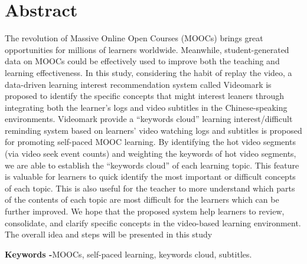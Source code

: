 \chapter*{Abstract}
The revolution of Massive Online Open Courses (MOOCs) brings great opportunities for millions of learners worldwide. Meanwhile, student-generated data on MOOCs could be effectively used to improve both the teaching and learning effectiveness.
In this study, considering the habit of replay the video, a data-driven learning interest recommendation system called Videomark is proposed to identify the specific concepts that might interest leaners through integrating both the learner’s logs and video subtitles in the Chinese-speaking environments.
Videomark provide a “keywords cloud” learning interest/difficult reminding system based on learners’ video watching logs and subtitles is proposed for promoting self-paced MOOC learning.
By identifying the hot video segments (via video seek event counts) and weighting the keywords of hot video segments, we are able to establish the “keywords cloud” of each learning topic.
This feature is valuable for learners to quick identify the most important or difficult concepts of each topic.
This is also useful for the teacher to more understand which parts of the contents of each topic are most difficult for the learners which can be further improved.
We hope that the proposed system help learners to review, consolidate, and clarify specific concepts in the video-based learning environment.
The overall idea and steps will be presented in this study


\noindent \textbf{Keywords -}{MOOCs, self-paced learning, keywords cloud, subtitles.}
